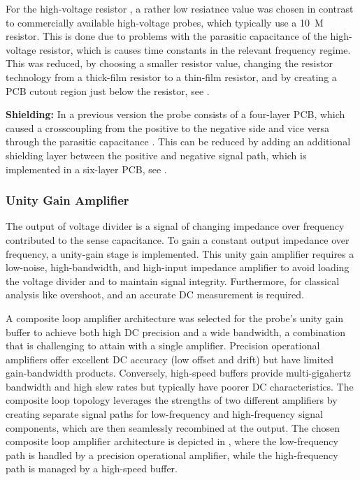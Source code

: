 For the high-voltage resistor , a rather low resiatnce value was chosen in contrast to commercially available high-voltage probes, which typically use a \SI{10}{M\Omega} resistor.
This is done due to problems with the parasitic capacitance  of the high-voltage resistor, which is causes time constants in the relevant frequency regime.
This was reduced, by choosing a smaller resistor value, changing the resistor technology from a thick-film resistor to a thin-film resistor, and by creating a PCB cutout region just below the resistor, see .

\textbf{Shielding:} 
In a previous version the probe consists of a four-layer PCB, which caused a crosscoupling from the positive to the negative side and vice versa through the parasitic capacitance .
This can be reduced by adding an additional shielding layer between the positive and negative signal path, which is implemented in a six-layer PCB, see .













\subsubsection*{Unity Gain Amplifier}
The output of voltage divider is a signal of changing impedance over frequency contributed to the sense capacitance.
To gain a constant output impedance over frequency, a unity-gain stage is implemented.
This unity gain amplifier requires a low-noise, high-bandwidth, and high-input impedance amplifier to avoid loading the voltage divider and to maintain signal integrity.
Furthermore, for classical analysis like overshoot,  and  an accurate DC measurement is required.



A composite loop amplifier architecture was selected for the probe's unity gain buffer to achieve both high DC precision and a wide bandwidth, a combination that is challenging to attain with a single amplifier. 
Precision operational amplifiers offer excellent DC accuracy (low offset and drift) but have limited gain-bandwidth products. 
Conversely, high-speed buffers provide multi-gigahertz bandwidth and high slew rates but typically have poorer DC characteristics. 
The composite loop topology leverages the strengths of two different amplifiers by creating separate signal paths for low-frequency and high-frequency signal components, which are then seamlessly recombined at the output.
The chosen composite loop amplifier architecture is depicted in , where the low-frequency path is handled by a precision operational amplifier, while the high-frequency path is managed by a high-speed buffer.

